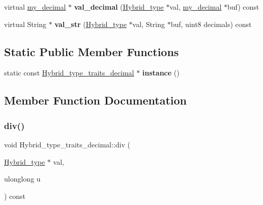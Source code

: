 \begin{DoxyCompactItemize}
virtual \mbox{\hyperlink{classmy__decimal}{my\+\_\+decimal}} $\ast$ {\bfseries val\+\_\+decimal} (\mbox{\hyperlink{structHybrid__type}{Hybrid\+\_\+type}} $\ast$val, \mbox{\hyperlink{classmy__decimal}{my\+\_\+decimal}} $\ast$buf) const
\item 
\mbox{\label{structHybrid__type__traits__decimal_a8b780326c76a346f6c23581bf9058d8d}} 
virtual String $\ast$ {\bfseries val\+\_\+str} (\mbox{\hyperlink{structHybrid__type}{Hybrid\+\_\+type}} $\ast$val, String $\ast$buf, uint8 decimals) const
\end{DoxyCompactItemize}
\subsection*{Static Public Member Functions}
\begin{DoxyCompactItemize}
\item 
\mbox{\label{structHybrid__type__traits__decimal_ad4259c403e7891815c0b677d4ecfc75e}} 
static const \mbox{\hyperlink{structHybrid__type__traits__decimal}{Hybrid\+\_\+type\+\_\+traits\+\_\+decimal}} $\ast$ {\bfseries instance} ()
\end{DoxyCompactItemize}


\subsection{Member Function Documentation}
\mbox{\label{structHybrid__type__traits__decimal_abacf79142edb4cc12105279b750ac73d}} 
\subsubsection{\texorpdfstring{div()}{div()}}
{\footnotesize\ttfamily void Hybrid\+\_\+type\+\_\+traits\+\_\+decimal\+::div (\begin{DoxyParamCaption}\item[{\mbox{\hyperlink{structHybrid__type}{Hybrid\+\_\+type}} $\ast$}]{val,  }\item[{ulonglong}]{u }\end{DoxyParamCaption}) const\hspace{0.3cm}{\ttfamily [virtual]}}

